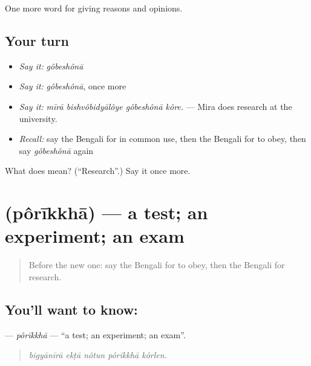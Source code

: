 \begin{grammarlens}[title={What you've built}]
One more word for giving reasons and opinions.
\end{grammarlens}

\subsection*{Your turn}
\begin{itemize}
\raggedright
  \item \emph{Say it:} \emph{gôbeshônā}
  \item \emph{Say it:} \emph{gôbeshônā}, once more
  \item \emph{Say it:} \emph{mīrā bishvôbidyālôye gôbeshônā kôre.} — Mira does research at the university.
  \item \emph{Recall:} say the Bengali for in common use, then the Bengali for to obey, then say \emph{gôbeshônā} again
\end{itemize}

\begin{tcolorbox}[breakable,colback=teal!4,colframe=teal!35!black,title={Before you move on}]
What does  mean? (\textquotedblleft{}Research\textquotedblright{}.) Say it once more.
\end{tcolorbox}
\section[\texorpdfstring{\bn{পরীক্ষা} (pôrīkkhā)}{পরীক্ষা (pôrīkkhā)}]{ (pôrīkkhā) — a test; an experiment; an exam}

\label{lesson:BN-C354-porikkha}



\begin{quote}
Before the new one: say the Bengali for to obey, then the Bengali for research.
\end{quote}

\subsection*{You'll want to know: }
\textbf{} — \emph{pôrīkkhā} — \textquotedblleft{}a test; an experiment; an exam\textquotedblright{}.

\begin{quote}
    
\end{quote}

\begin{quote}
\emph{bigyānīrā ekṭā nôtun pôrīkkhā kôrlen.}
\end{quote}


